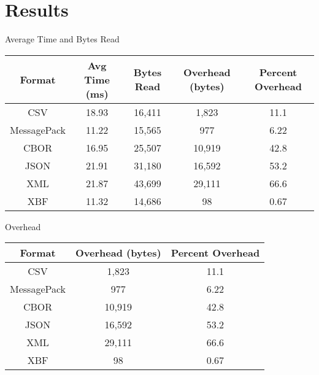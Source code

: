 \documentclass{beamer}
\begin{document}
\section{Results}

\begin{frame}{Average Time and Bytes Read}
	\center
	\begin{tabular}{|c|c|c|c|c|}
		\hline
		\textbf{Format} & \textbf{Avg Time (ms)} & \textbf{Bytes Read} & \textbf{Overhead (bytes)} & \textbf{Percent Overhead} \\ 
		\hline                                                                                                                    
		CSV             & 18.93                  & 16,411              & 1,823                     & 11.1                      \\ 
		MessagePack     & 11.22                  & 15,565              & 977                       & 6.22                      \\ 
		CBOR            & 16.95                  & 25,507              & 10,919                    & 42.8                      \\ 
		JSON            & 21.91                  & 31,180              & 16,592                    & 53.2                      \\ 
		XML             & 21.87                  & 43,699              & 29,111                    & 66.6                      \\ 
		XBF             & 11.32                  & 14,686              & 98                        & 0.67                      \\ 
		\hline
	\end{tabular}
\end{frame}

\begin{frame}{Overhead}
	\center
	\begin{tabular}{|c|c|c|}
		\hline
		\textbf{Format} & \textbf{Overhead (bytes)} & \textbf{Percent Overhead} \\
		\hline
		CSV             & 1,823                     & 11.1                      \\
		MessagePack     & 977                       & 6.22                      \\
		CBOR            & 10,919                    & 42.8                      \\
		JSON            & 16,592                    & 53.2                      \\
		XML             & 29,111                    & 66.6                      \\
		XBF             & 98                        & 0.67                      \\
		\hline
	\end{tabular}
\end{frame}

\backmatter[notitle]
\end{document}
